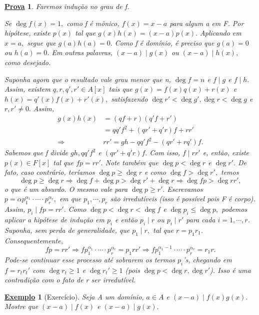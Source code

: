 \documentclass{article}
\newtheorem{example}{\underline{Exemplo}}
\newtheorem*{proof*}{\underline{Prova}}
\begin{document}
\begin{proof*}
  Faremos indução no grau de f.
  
  Se \(\deg{f(x)} = 1,\) como f é mônico, \(f(x) = x-a\) para algum a em F. Por hipótese, existe \(p(x)\) tal que
 \(g(x)h(x) = (x-a)p(x).\) Aplicando em \(x=a,\) segue que \(g(a)h(a) = 0.\) Como f é domínio, é preciso que
  \(g(a) = 0\) ou \(h(a) = 0\). Em outras palavras, \((x-a)\mid g(x)\) ou \((x-a)\mid h(x),\) como desejado.

  Suponha agora que o resultado vale grau menor que n, \(\deg{f} = n\) e \(f\mid g\) e \(f\mid h.\) Assim, existem 
 \(q, r, q', r'\in A[x]\) tais que \(g(x) = f(x)q(x) + r(x)\) e \(h(x) = q'(x)f(x) + r'(x),\) satisfazendo
   \(\deg{r'} < \deg{g'}, \deg{r} < \deg{g}\) e \(r, r'\neq 0.\) Assim,
\begin{align*}
  g(x)h(x) &= (qf + r)(q'f + r')\\
           &= qq'f^{2} + (qr' + q'r)f + rr'\\
  \Rightarrow & rr' = gh - qq'f^{2} - (qr' + rq')f.
\end{align*}
  Sabemos que f divide \(gh, qq'f^{2}\) e \((qr' + q'r)f.\) Com isso, \(f\mid rr'\) e, então,
existe \(p(x)\in F[x]\) tal que \(fp = rr'.\) Note também que \(\deg{p} < \deg{r} \) e \(\deg{r'}.\) De fato,
caso contrário, teríamos \(\deg{p}\geq \deg{r}\) e como \(\deg{f} > \deg{r'},\) temos 
  \[
    \deg{p}\geq \deg{r} \Rightarrow \deg{f} + \deg{p} > \deg{r'} + \deg{r} \Rightarrow \deg{fp} > \deg{rr'},
  \]
  o que é um absurdo. O mesmo vale para \(\deg{p}\geq r'.\) Escrevamos \(p = \alpha p_{1}^{\alpha_{1}}\cdot \cdots \cdot p_{r}^{\alpha_{r}},\) 
em que \(p_{1}, \cdots, p_{r}\) são irredutíveis (isso é possível pois F é corpo). Assim, \(p_{i}\mid fp = rr'.\) 
Como \(\deg{p} < \deg{r} < \deg{f}\) e \(\deg{p_{i}}\leq \deg{p},\) podemos aplicar a hipótese de indução em \(p_{i}\) e então
 \(p_{i}\mid r\) ou \(p_{i}\mid r'\) para cada \(i=1, \cdots, r\). Suponha, sem perda de generalidade, que \(p_{1}\mid r,\) tal que 
 \(r=p_{1}r_{1}\). Consequentemente, 
 \[
   fp = rr' \Rightarrow fp_{1}^{\alpha_{1}}\cdot \cdots \cdot p_{r}^{\alpha_{r}} = p_{1}rr' \Rightarrow fp_{1}^{\alpha_{1} -1}\cdot \cdots \cdot p_{r}^{\alpha_{r}} = r_{1}r.
 \]
 Pode-se continuar esse processo até sobrarem os termos \(p_{i}\)'s, chegando em
\(f = r_{t}r_{t}'\) com \(\deg{r_{t}}\geq 1\) e \(\deg{r_{t}'}\geq 1\) (pois \(\deg{p} < \deg{r}, \deg{r'}\)). Isso é uma contradição
com o fato de r ser irredutível.
\end{proof*}
\begin{example}[Exercício]
  Seja A um domínio, \(a\in A\) e \((x-a)\mid f(x)g(x).\) Mostre que \((x-a)\mid f(x)\) e \((x-a)\mid g(x).\) 
\end{example}
\end{document}
